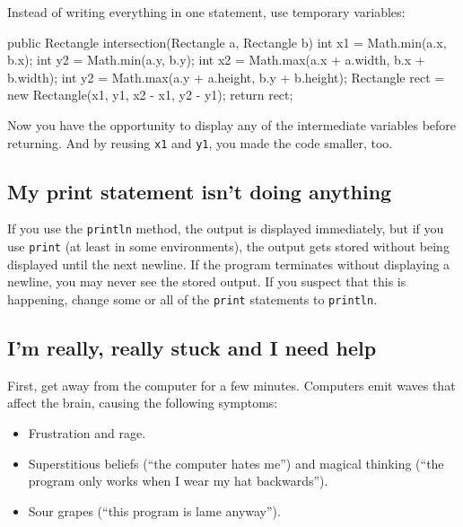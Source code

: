 \documentclass[12pt]{book}
\theoremstyle{exercise}
\newcommand{\java}[1]{\verb"#1"}
\begin{document}
Instead of writing everything in one statement, use temporary variables:

\begin{code}
    public Rectangle intersection(Rectangle a, Rectangle b) {
        int x1 = Math.min(a.x, b.x);
        int y2 = Math.min(a.y, b.y);
        int x2 = Math.max(a.x + a.width, b.x + b.width);
        int y2 = Math.max(a.y + a.height, b.y + b.height);
        Rectangle rect = new Rectangle(x1, y1, x2 - x1, y2 - y1);
        return rect;
    }
\end{code}

Now you have the opportunity to display any of the intermediate variables before returning.
And by reusing \java{x1} and \java{y1}, you made the code smaller, too.


\subsection*{My print statement isn't doing anything}


If you use the \java{println} method, the output is displayed immediately, but if you use \java{print} (at least in some environments), the output gets stored without being displayed until the next newline.
If the program terminates without displaying a newline, you may never see the stored output.
If you suspect that this is happening, change some or all of the \java{print} statements to \java{println}.


\subsection*{I'm really, really stuck and I need help}

First, get away from the computer for a few minutes.
Computers emit waves that affect the brain, causing the following symptoms:

\begin{itemize}

\item Frustration and rage.

\item Superstitious beliefs (``the computer hates me'') and magical thinking (``the program only works when I wear my hat backwards'').

\item Sour grapes (``this program is lame anyway'').

\end{itemize}
\end{document}
